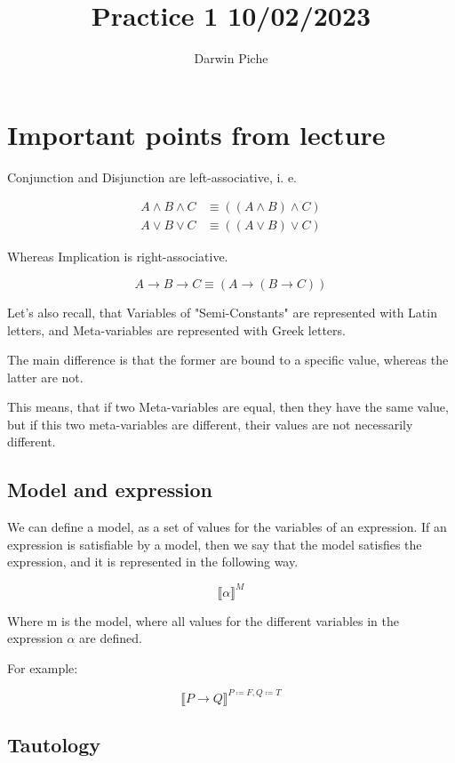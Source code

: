 \documentclass{article}
\title{Practice 1 10/02/2023}
\author{Darwin Piche}
\begin{document}
\maketitle

\section{Important points from lecture}

Conjunction and Disjunction are left-associative, i. e.

\begin{align*}
    A \wedge B \wedge C &\equiv ((A \wedge B) \wedge C) \\
    A \vee B \vee C &\equiv ((A \vee B) \vee C)
\end{align*}

Whereas Implication is right-associative.

$$
    A \rightarrow B \rightarrow C \equiv (A \rightarrow (B \rightarrow C))
$$

Let's also recall, that Variables of "Semi-Constants" are represented with Latin letters, and Meta-variables are represented with Greek letters.

The main difference is that the former are bound to a specific value, whereas the latter are not.

This means, that if two Meta-variables are equal, then they have the same value, but if this two meta-variables are different, their values are not necessarily different.

\subsection*{Model and expression}

We can define a model, as a set of values for the variables of an expression. If an expression is satisfiable by a model, then we say that the model satisfies the expression, and it is represented in the following way.

$$
    \llbracket \alpha \rrbracket ^{M}
$$

Where m is the model, where all values for the different variables in the expression $\alpha$ are defined.

For example:

$$
    \llbracket P \rightarrow Q \rrbracket ^{P\coloneqq F, Q\coloneqq T}
$$

\subsection*{Tautology}
\end{document}
